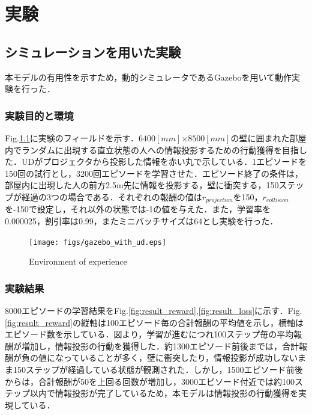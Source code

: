 \documentclass[12pt]{sonota/aislab}
\begin{document}
\chapter{実験}
\section{シミュレーションを用いた実験}
本モデルの有用性を示すため，動的シミュレータであるGazeboを用いて動作実験を行った．

\subsection{実験目的と環境}
Fig.\ref{gazebo}に実験のフィールドを示す．$6400[mm]$×$8500[mm]$の壁に囲まれた部屋内でランダムに出現する直立状態の人への情報投影するための行動獲得を目指した．UDがプロジェクタから投影した情報を赤い丸で示している．1エピソードを150回の試行とし，3200回エピソードを学習させた．エピソード終了の条件は，部屋内に出現した人の前方2.5m先に情報を投影する，壁に衝突する，150ステップが経過の3つの場合である．それぞれの報酬の値は$r_{projection}$を150，$r_{collision}$を-150で設定し，それ以外の状態では-1の値を与えた．また，学習率を0.000025，割引率は0.99，またミニバッチサイズは64とし実験を行った．


\begin{figure}[t]
\begin{center}
\texttt{[image: figs/gazebo\_with\_ud.eps]}
\caption{Environment of experience}
\label{gazebo}
\end{center}
\end{figure}

\subsection{実験結果}
8000エピソードの学習結果をFig.\ref{fig:result_reward},\ref{fig:result_loss}に示す．Fig.\ref{fig:result_reward}の縦軸は100エピソード毎の合計報酬の平均値を示し，横軸はエピソード数を示している．図より，学習が進むにつれ100ステップ毎の平均報酬が増加し，情報投影の行動を獲得した．約1300エピソード前後までは，合計報酬が負の値になっていることが多く，壁に衝突したり，情報投影が成功しないまま150ステップが経過している状態が観測された．しかし，1500エピソード前後からは，合計報酬が50を上回る回数が増加し，3000エピソード付近では約100ステップ以内で情報投影が完了しているため，本モデルは情報投影の行動獲得を実現している．
\end{document}
